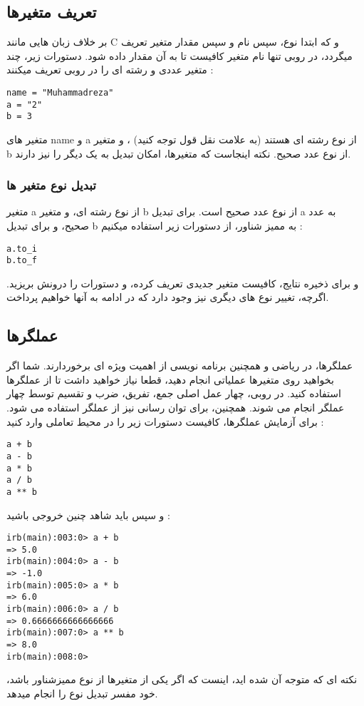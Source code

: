 \documentclass[11pt]{article}
\begin{document}
\subsection{تعریف متغیرها}
بر خلاف زبان هایی مانند C و 
که ابتدا نوع، سپس نام و سپس مقدار متغیر تعریف میگردد، در روبی تنها نام متغیر کافیست تا به آن مقدار داده شود. دستورات زیر، چند متغیر عددی و رشته ای را در روبی تعریف میکنند :
\begin{latin}
\begin{verbatim}
name = "Muhammadreza"
a = "2"
b = 3
\end{verbatim}
\end{latin}
متغیر های name و a از نوع رشته ای هستند (به علامت نقل قول توجه کنید) ، و متغیر b از نوع عدد صحیح. نکته اینجاست که متغیرها، امکان تبدیل به یک دیگر را نیز دارند. 
\subsubsection{تبدیل نوع متغیر ها}
متغیر a از نوع رشته ای، و متغیر b از نوع عدد صحیح است. برای تبدیل a به عدد صحیح، و برای تبدیل b  به ممیز شناور، از دستورات زیر استفاده میکنیم :
\begin{latin}
\begin{verbatim}
a.to_i
b.to_f
\end{verbatim}
\end{latin}
و برای ذخیره نتایج، کافیست متغیر جدیدی تعریف کرده، و دستورات را درونش بریزید. اگرچه، تغییر نوع های دیگری نیز وجود دارد که در ادامه به آنها خواهیم پرداخت. 
\subsection{عملگرها}
عملگرها، در ریاضی و همچنین برنامه نویسی از اهمیت ویژه ای برخوردارند. شما اگر بخواهید روی متغیرها عملیاتی انجام دهید، قطعا نیاز خواهید داشت تا از عملگرها استفاده کنید. در روبی، چهار عمل اصلی جمع، تفریق، ضرب و تقسیم توسط چهار عملگر
\lr{+, -, *, /}
انجام می شوند. همچنین، برای توان رسانی نیز از عملگر
\lr{**}
استفاده می شود. برای آزمایش عملگرها، کافیست دستورات زیر را در محیط تعاملی وارد کنید :
\begin{latin}
\begin{verbatim}
a + b 
a - b
a * b
a / b
a ** b
\end{verbatim}
\end{latin}
و سپس باید شاهد چنین خروجی باشید : 
\begin{latin}
\begin{verbatim}
irb(main):003:0> a + b
=> 5.0
irb(main):004:0> a - b
=> -1.0
irb(main):005:0> a * b
=> 6.0
irb(main):006:0> a / b
=> 0.6666666666666666
irb(main):007:0> a ** b
=> 8.0
irb(main):008:0> 
\end{verbatim}
\end{latin}
نکته ای که متوجه آن شده اید، اینست که اگر یکی از متغیرها از نوع ممیزشناور باشد، خود مفسر تبدیل نوع را انجام میدهد. 
\end{document}
